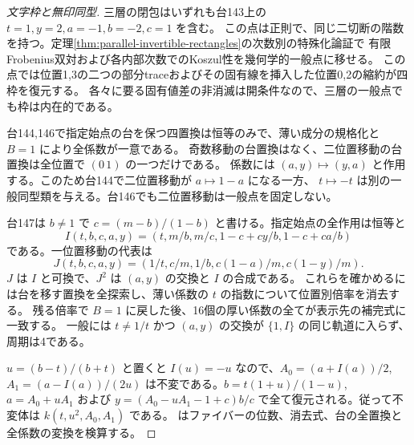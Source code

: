 \begin{proof}[文字枠と無印同型]
三層の閉包はいずれも台143上の $t=1,y=2,a=-1,b=-2,c=1$ を含む。
この点は正則で、同じ二切断の階数を持つ。定理\ref{thm:parallel-invertible-rectangles}の次数別の特殊化論証で
有限Frobenius双対および各内部次数でのKoszul性を幾何学的一般点に移せる。
この点では位置1,3の二つの部分traceおよびその固有線を挿入した位置0,2の縮約が四枠を復元する。
各々に要る固有値差の非消滅は開条件なので、三層の一般点でも枠は内在的である。

台144,146で指定始点の台を保つ四置換は恒等のみで、薄い成分の規格化と $B=1$ により全係数が一意である。
奇数移動の台置換はなく、二位置移動の台置換は全位置で $(0\,1)$ の一つだけである。
係数には $(a,y)\mapsto(y,a)$ と作用する。このため台144で二位置移動が $a\mapsto1-a$ になる一方、
$t\mapsto-t$ は別の一般同型類を与える。台146でも二位置移動は一般点を固定しない。

台147は $b\ne1$ で $c=(m-b)/(1-b)$ と書ける。指定始点の全作用は恒等と
\[
 I(t,b,c,a,y)=(t,m/b,m/c,1-c+cy/b,1-c+ca/b)
\]
である。一位置移動の代表は
\[
 J(t,b,c,a,y)=(1/t,c/m,1/b,c(1-a)/m,c(1-y)/m).
\]
$J$ は $I$ と可換で、$J^2$ は $(a,y)$ の交換と $I$ の合成である。
これらを確かめるには台を移す置換を全探索し、薄い係数の $t$ の指数について位置別倍率を消去する。
残る倍率で $B=1$ に戻した後、16個の厚い係数の全てが表示先の補完式に一致する。
一般には $t\ne1/t$ かつ $(a,y)$ の交換が $\{1,I\}$ の同じ軌道に入らず、周期は4である。

$u=(b-t)/(b+t)$ と置くと $I(u)=-u$ なので、$A_0=(a+I(a))/2$,
$A_1=(a-I(a))/(2u)$ は不変である。$b=t(1+u)/(1-u)$, $a=A_0+u A_1$ および
$y=(A_0-u A_1-1+c)b/c$ で全て復元される。従って不変体は $k(t,u^2,A_0,A_1)$ である。
 はファイバーの位数、消去式、台の全置換と全係数の変換を検算する。
\end{proof}
